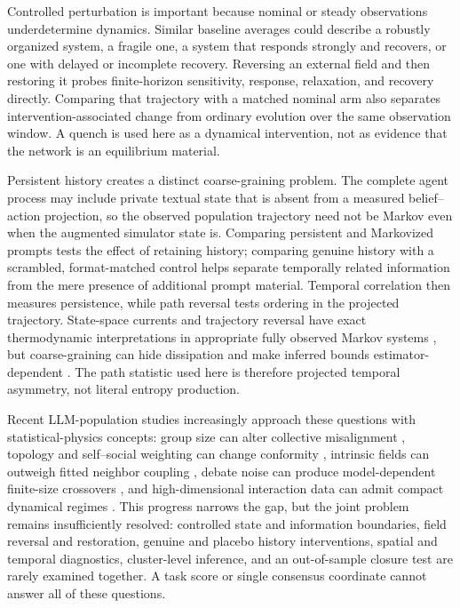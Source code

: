 \documentclass[12pt]{article}
\begin{document}
Controlled perturbation is important because nominal or steady observations
underdetermine dynamics.  Similar baseline averages could describe a robustly
organized system, a fragile one, a system that responds strongly and
recovers, or one with delayed or incomplete recovery.  Reversing an external
field and then restoring it probes finite-horizon sensitivity, response,
relaxation, and recovery directly.  Comparing that trajectory with a matched
nominal arm also separates intervention-associated change from ordinary
evolution over the same observation window.  A quench is used here as a
dynamical intervention, not as evidence that the network is an equilibrium
material.

Persistent history creates a distinct coarse-graining problem.  The complete
agent process may include private textual state that is absent from a measured
belief--action projection, so the observed population trajectory need not be
Markov even when the augmented simulator state is.  Comparing persistent and
Markovized prompts tests the effect of retaining history; comparing genuine
history with a scrambled, format-matched control helps separate temporally
related information from the mere presence of additional prompt material.
Temporal correlation then measures persistence, while path reversal tests
ordering in the projected trajectory.  State-space currents and trajectory
reversal have exact thermodynamic interpretations in appropriate fully
observed Markov systems \cite{seifert2012,roldan2012}, but coarse-graining can
hide dissipation and make inferred bounds estimator-dependent
\cite{kawaguchi2013,busiello2019}.  The path statistic used here is therefore
projected temporal asymmetry, not literal entropy production.

Recent LLM-population studies increasingly approach these questions with
statistical-physics concepts: group size can alter collective misalignment
\cite{flint2025}, topology and self--social weighting can change conformity
\cite{han2026}, intrinsic fields can outweigh fitted neighbor coupling
\cite{denobili2026}, debate noise can produce model-dependent finite-size
crossovers \cite{okawa2026}, and high-dimensional interaction data can admit
compact dynamical regimes \cite{el2026}.  This progress narrows the gap, but
the joint problem remains insufficiently resolved: controlled state and
information boundaries, field reversal and restoration, genuine and placebo
history interventions, spatial and temporal diagnostics, cluster-level
inference, and an out-of-sample closure test are rarely examined together.
A task score or single consensus coordinate cannot answer all of these
questions.
\end{document}
